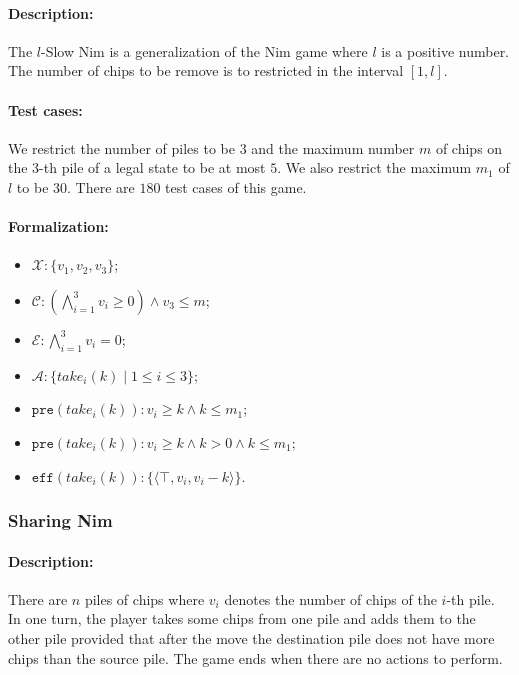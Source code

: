 \documentclass[review]{elsarticle}
\newcommand{\set}[1]{\{ #1 \}}
\newcommand{\tuple}[1]{\langle {#1} \rangle}
\newcommand{\true}{\top}
\newcommand{\statevar}{\mathcal{X}}
\newcommand{\act}{\mathcal{A}}
\newcommand{\constraint}{\mathcal{C}}
\newcommand{\estate}{\mathcal{E}}
\newcommand{\pre}{\mathtt{pre}}
\newcommand{\eff}{\mathtt{eff}}
\begin{document}
\paragraph{Description:} 
The $l$-Slow Nim is a generalization of the Nim game where $l$ is a positive number.
The number of chips to be remove is to restricted in the interval $[1, l]$.

\paragraph{Test cases:}
We restrict the number of piles to be $3$ and the maximum number $m$ of chips on the 3-th pile of a legal state to be at most $5$.
We also restrict the maximum $m_1$ of $l$ to be $30$.
There are $180$ test cases of this game.



\paragraph{Formalization:}

\begin{itemize}
	\item $\statevar: \set{v_1, v_2, v_3} $;
	\item $\constraint: (\bigwedge_{i=1}^{3} v_i \ge 0) \wedge v_3 \le m$;
	\item $\estate: \bigwedge_{i=1}^{3} v_i = 0$;
	\item $\act:\set{take_i(k) {\mid} 1 \le i \le 3}$;
	\item $\pre(take_i(k)) : v_i \ge k \wedge  k \le m_1$;
	\item {\color{red}$\pre(take_i(k)) : v_i \ge k \wedge k > 0 \wedge k \le m_1$;}
	\item $\eff(take_i(k)) :  \set{\tuple{\true, v_i, v_i - k}}$.
\end{itemize}


\subsubsection{Sharing Nim \protect\cite{Ho2016}}

\paragraph{Description:} 
There are $n$ piles of chips where $v_i$ denotes the number of chips of the $i$-th pile.
In one turn, the player takes some chips from one pile and adds them to the other pile provided that after the move the destination pile does not have more chips than the source pile. 
The game ends when there are no actions to perform.
\end{document}
